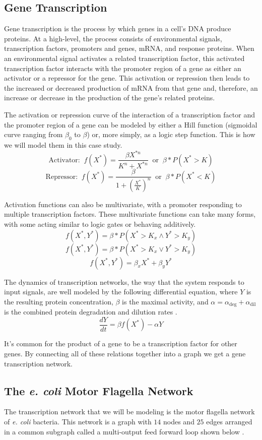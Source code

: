 \documentclass[12pt]{article}
\begin{document}
\subsection*{Gene Transcription}
Gene transcription is the process by which genes in a cell's DNA produce proteins.
At a high-level, the process consists of environmental signals, transcription factors, promoters and genes, mRNA, and response proteins.
When an environmental signal activates a related transcription factor, this activated transcription factor interacts with the promoter region of a gene as either an activator or a repressor for the gene.
This activation or repression then leads to the increased or decreased production of mRNA from that gene and, therefore, an increase or decrease in the production of the gene's related proteins.

The activation or repression curve of the interaction of a transcription factor and the promoter region of a gene can be modeled by either a Hill function (sigmoidal curve ranging from $\beta_0$ to $\beta$) or, more simply, as a logic step function.
This is how we will model them in this case study.
$$\text{Activator: } \ f(X^*)=\frac{\beta X^{*n}}{K^n + X^{*n}} \ \text{ or } \ \beta * P(X^* > K)$$
$$\text{Repressor: } \ f(X^*)=\frac{\beta}{1 + \left(\frac{X^*}{K}\right)^n} \ \text{ or } \ \beta * P(X^* < K)$$

Activation functions can also be multivariate, with a promoter responding to multiple transcription factors.
These multivariate functions can take many forms, with some acting similar to logic gates or behaving additively.
$$f(X^*, Y^*)=\beta*P(X^* > K_x \land Y^* > K_y)$$
$$f(X^*, Y^*)=\beta*P(X^* > K_x \lor Y^* > K_y)$$
$$f(X^*, Y^*)=\beta_x X^* + \beta_y Y^*$$

The dynamics of transcription networks, the way that the system responds to input signals, are well modeled by the following differential equation, where $Y$ is the resulting protein concentration, $\beta$ is the maximal activity, and $\alpha=\alpha_{\text{deg}} + \alpha_{\text{dil}}$ is the combined protein degradation and dilution rates \cite{alon2019introduction}.
$$\frac{dY}{dt}=\beta f(X^*) - \alpha Y$$

It's common for the product of a gene to be a transcription factor for other genes.
By connecting all of these relations together into a graph we get a gene transcription network.



\subsection*{The \textit{e. coli} Motor Flagella Network}
The transcription network that we will be modeling is the motor flagella network of \textit{e. coli} bacteria.
This network is a graph with $14$ nodes and $25$ edges arranged in a common subgraph called a multi-output feed forward loop shown below \cite{alon2019introduction}.
\end{document}
